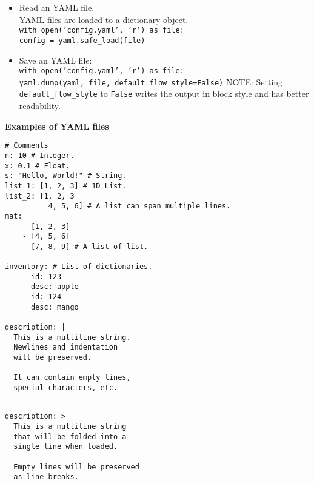 \begin{itemize}
\item Read an YAML file.\\ 
        YAML files are loaded to a dictionary object.\\
        \texttt{with open('config.yaml', 'r') as file:}\\
        \hspace{8pt}\texttt{config = yaml.safe\_load(file)}\\
\item Save an YAML file:\\
        \texttt{with open('config.yaml', 'r') as file:}\\
        \hspace{8pt}\texttt{yaml.dump(yaml, file, default\_flow\_style=False)}
        NOTE: Setting \texttt{default\_flow\_style} to \texttt{False} writes the output in block style and has better readability.\\
\end{itemize}

\textbf{Examples of YAML files}

\begin{mdframed}[backgroundcolor=gray!10,linecolor=Firebrick4]
\begin{verbatim}
# Comments
n: 10 # Integer.
x: 0.1 # Float.
s: "Hello, World!" # String.
list_1: [1, 2, 3] # 1D List.
list_2: [1, 2, 3
          4, 5, 6] # A list can span multiple lines.
mat:
    - [1, 2, 3]
    - [4, 5, 6]
    - [7, 8, 9] # A list of list.

inventory: # List of dictionaries.
    - id: 123
      desc: apple
    - id: 124
      desc: mango

description: |
  This is a multiline string.
  Newlines and indentation
  will be preserved.
  
  It can contain empty lines,
  special characters, etc.

\end{verbatim}
\end{mdframed}

\columnbreak


\begin{mdframed}[backgroundcolor=gray!10,linecolor=Firebrick4]
\begin{verbatim}

description: >
  This is a multiline string
  that will be folded into a
  single line when loaded.
  
  Empty lines will be preserved
  as line breaks.
\end{verbatim}
\end{mdframed}

\pagebreak